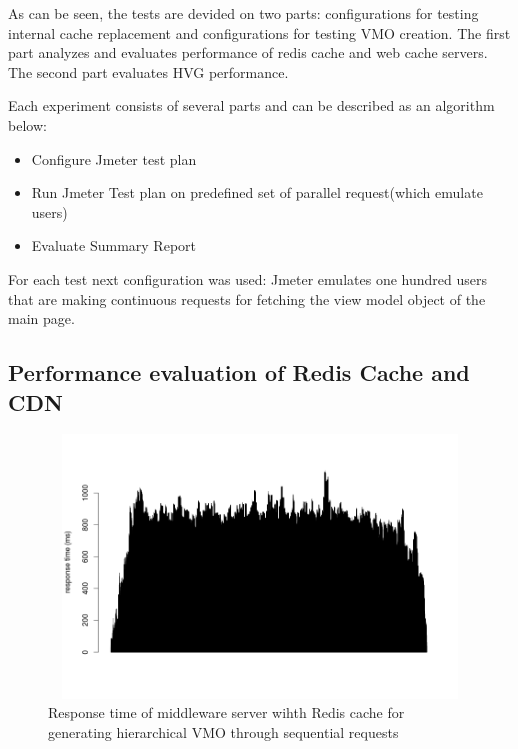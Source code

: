 As can be seen, the tests are devided on two parts: configurations for testing internal cache replacement and configurations for testing VMO creation. The first part analyzes and evaluates performance of redis cache and web cache servers. The second part  evaluates HVG performance.

Each experiment consists of several parts and can be described as an algorithm below: 

\begin{itemize}
  \item Configure Jmeter test plan
  \item Run Jmeter Test plan on predefined set of parallel request(which emulate users)
  \item Evaluate Summary Report
\end{itemize}

For each test next configuration was used: Jmeter emulates one hundred users that are making continuous requests for fetching the view model object of the main page.  


\subsection{Performance evaluation of Redis Cache and CDN}

\begin{figure}[h!]
    \centering
    \includegraphics[width=15cm,height=7cm,keepaspectratio]{images/vmo_redis_mult_seq.png}
    \caption{Response time of middleware server wihth Redis cache for generating hierarchical VMO through sequential requests}
    \label{fig:vmo_redis_mult_seq}
\end{figure}


